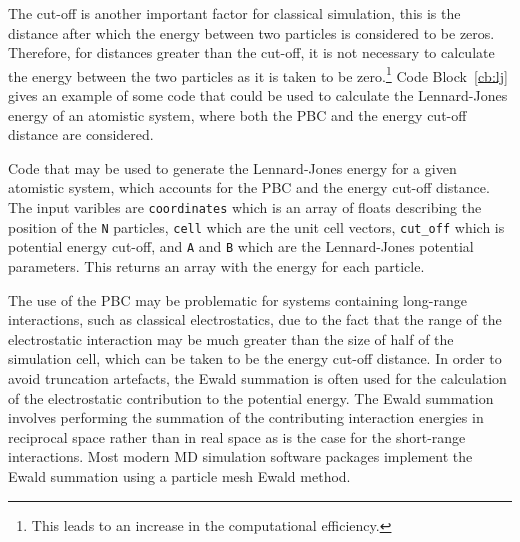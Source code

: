 The cut-off is another important factor for classical simulation, this is the distance after which the energy between two particles is considered to be zeros.
Therefore, for distances greater than the cut-off, it is not necessary to calculate the energy between the two particles as it is taken to be zero.\footnote{This leads to an increase in the computational efficiency.}
Code Block~\ref{cb:lj} gives an example of some code that could be used to calculate the Lennard-Jones energy of an atomistic system, where both the PBC and the energy cut-off distance are considered.
%
\begin{listing}
    \centering
    \caption{Code that may be used to generate the Lennard-Jones energy for a given atomistic system, which accounts for the PBC and the energy cut-off distance. The input varibles are \texttt{coordinates} which is an array of floats describing the position of the \texttt{N} particles, \texttt{cell} which are the unit cell vectors, \texttt{cut\_off} which is potential energy cut-off, and \texttt{A} and \texttt{B} which are the Lennard-Jones potential parameters. This returns an array with the energy for each particle.}
    
    \label{cb:lj}
\end{listing}
%

The use of the PBC may be problematic for systems containing long-range interactions, such as classical electrostatics, due to the fact that the range of the electrostatic interaction may be much greater than the size of half of the simulation cell, which can be taken to be the energy cut-off distance.
In order to avoid truncation artefacts, the Ewald summation is often used for the calculation of the electrostatic contribution to the potential energy.\autocite{ewald_berechnung_1921}
The Ewald summation involves performing the summation of the contributing interaction energies in reciprocal space rather than in real space as is the case for the short-range interactions.
Most modern MD simulation software packages implement the Ewald summation using a particle mesh Ewald method.\autocite{essmann_smooth_1995}

